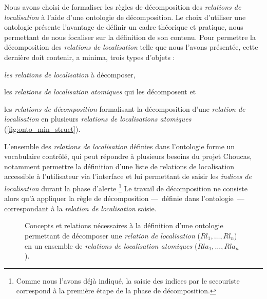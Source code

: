 Nous avons choisi de formaliser les règles de décomposition des
\emph{relations de localisation} à l'aide d'une ontologie de
décomposition. Le choix d'utiliser une ontologie présente l'avantage
de définir un cadre théorique et pratique, nous permettant de nous
focaliser sur la définition de son contenu. Pour permettre la
décomposition des \emph{relations de localisation} telle que nous
l'avons présentée, cette dernière doit contenir, a minima, trois types
d'objets :
%
\begin{enumerate*}[label=(\alph*)]
\item \emph{les relations de localisation} à décomposer,
\item les \emph{relations de localisation atomiques} qui les
  décomposent et
\item les \emph{relations de décomposition} formalisant la
  décomposition d'une \emph{relation de localisation} en plusieurs
  \emph{relations de localisations atomiques}
  (\autoref{fig:onto_min_struct}).
\end{enumerate*}
%
L'ensemble des \emph{relations de localisation} définies dans
l'ontologie forme un vocabulaire contrôlé, qui peut répondre à
plusieurs besoins du projet Choucas, notamment permettre la définition
d'une liste de relations de localisation accessible à l'utilisateur
via l'interface et lui permettant de saisir les \emph{indices de
  localisation} durant la phase d'alerte \footnote{Comme nous l'avons
  déjà indiqué, la saisie des indices par le secouriste correspond à
  la première étape de la phase de décomposition.} Le travail de
décomposition ne consiste alors qu'à appliquer la règle de
décomposition ---~définie dans l'ontologie~--- correspondant à la
\emph{relation de localisation} saisie.

\begin{figure}[hb]
  \centering
   
  \caption[Structure générale d'une ontologie de
  décomposition]{Concepts et relations nécessaires à la définition
    d'une ontologie permettant de décomposer une \emph{relation de
      localisation} ($Rl_1, \ldots, Rl_n$) en un ensemble de
    \emph{relations de localisation atomiques}
    ($Rla_1, \ldots, Rla_n$).}
  \label{fig:onto_min_struct}
\end{figure}

